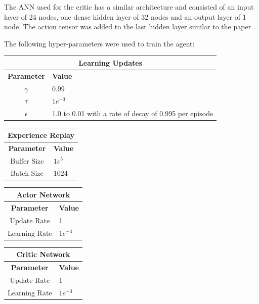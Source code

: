 \documentclass[12pt]{article}
\begin{document}
The ANN used for the critic has a similar architecture and consisted of an input layer of 24 nodes, one dense hidden layer of 32 nodes and an output layer of 1 node. 
The action tensor was added to the last hidden layer similar to the paper \cite{ddpg_paper}.

The following hyper-parameters were used to train the agent:

\begin{table}[h!t]
\begin{center}
\begin{tabular}{|c|l|}
	\hline
	\multicolumn{2}{|c|}{\textbf{Learning Updates}}\\
	\hline
	\hline
	\textbf{Parameter} & \textbf{Value}\\
	\hline
	$\gamma$ & $0.99$\\
	$\tau$ & $1e^{-3}$\\
	$\epsilon$ & 1.0 to 0.01 with a rate of decay of 0.995 per episode\\
	\hline
\end{tabular}
\end{center}
\end{table}

\begin{table}
\begin{center}
\begin{minipage}{.3\linewidth}
\begin{tabular}{|c|l|}
	\hline
	\multicolumn{2}{|c|}{\textbf{Experience Replay}}\\
	\hline
	\hline
	\textbf{Parameter} & \textbf{Value}\\
	\hline
	Buffer Size & $1e^{5}$\\
	Batch Size & $1024$\\
	\hline
\end{tabular}
\end{minipage}
\begin{minipage}{.3\linewidth}
\begin{tabular}{|c|l|}
	\hline
	\multicolumn{2}{|c|}{\textbf{Actor Network}}\\
	\hline
	\hline
	\textbf{Parameter} & \textbf{Value}\\
	\hline
		Update Rate & 1 \\
		Learning Rate & $1e^{-4}$ \\
	\hline
\end{tabular}
\end{minipage}
\begin{minipage}{.3\linewidth}
\begin{tabular}{|c|l|}
	\hline
	\multicolumn{2}{|c|}{\textbf{Critic Network}}\\
	\hline
	\hline
	\textbf{Parameter} & \textbf{Value}\\
	\hline
		Update Rate & 1 \\
		Learning Rate & $1e^{-3}$ \\
	\hline
\end{tabular}
\end{minipage}
\end{center}
\end{table}
\end{document}

